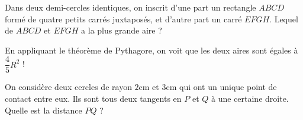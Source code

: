 \begin{exo}
Dans deux demi-cercles identiques, on inscrit d'une part un rectangle $ABCD$ formé de quatre petits carrés juxtaposés, et d'autre part un carré $EFGH$.
Lequel de $ABCD$ et $EFGH$ a la plus grande aire ?

\begin{center}
\hspace{1cm}
\end{center}
\begin{sol}
En appliquant le théorème de Pythagore, on voit que les deux aires sont égales  à $\dfrac 45 R^2$ !
\end{sol}

\end{exo}






\begin{exo}
On considère deux cercles de rayon $2$cm et $3$cm qui ont un unique point de contact entre eux.
Ils sont tous deux tangents en $P$ et $Q$ à une certaine droite.
Quelle est la distance $PQ$ ?
\begin{center}
\end{center}
\begin{hint}
\end{hint}
\begin{sol}
\end{sol}
\end{exo}


